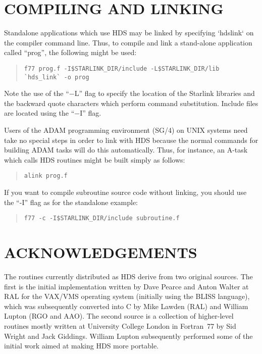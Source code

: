 \documentclass[twoside,11pt]{article}
\newcommand{\htmlref}[2]{#1}
\newcommand{\xref}[3]{#1}
\newcommand{\xlabel}[1]{}
\renewcommand{\_}{\texttt{\symbol{95}}}
\newcommand{\qt}[1]{``#1''}
\newcommand{\qt}[1]{{\tt{"}}#1{\tt{"}}}
\begin{document}
\section{\xlabel{compiling_and_linking}COMPILING AND LINKING}

Standalone applications which use HDS may be linked by specifying `hds\_link`
on the compiler command line. Thus, to compile and link a stand-alone
application called \qt{prog}, the following might be used:

\small
\begin{quote}
\begin{verbatim}
f77 prog.f -I$STARLINK_DIR/include -L$STARLINK_DIR/lib `hds_link` -o prog
\end{verbatim}
\end{quote}
\normalsize

Note the use of the \qt{$-$L} flag to specify the location of the Starlink
libraries and the backward quote characters which perform command
substitution. Include files are located using the \qt{$-$I} flag.

Users of the ADAM programming environment (\xref{SG/4}{sg4}{}) on UNIX
systems need take no special steps in order to link with HDS because
the normal commands for building ADAM tasks will do this
automatically. Thus, for instance, an A-task which calls HDS routines
might be built simply as follows:

\small
\begin{quote}
\begin{verbatim}
alink prog.f
\end{verbatim}
\end{quote}
\normalsize

If you want to compile subroutine source code without linking, you should use
the \qt{-I} flag as for the standalone example:

\small
\begin{quote}
\begin{verbatim}
f77 -c -I$STARLINK_DIR/include subroutine.f
\end{verbatim}
\end{quote}
\normalsize

\section{ACKNOWLEDGEMENTS}

The \htmlref{routines}{appendix:alphalist} currently distributed as
HDS derive from two original sources. The first is the initial
implementation written by Dave Pearce and Anton Walter at RAL for the
VAX/VMS operating system (initially using the BLISS language), which
was subsequently converted into C by Mike Lawden (RAL) and William
Lupton (RGO and AAO). The second source is a collection of
higher-level routines mostly written at University College London in
Fortran~77 by Sid Wright and Jack Giddings. William Lupton
subsequently performed some of the initial work aimed at making HDS
more portable.
\end{document}
